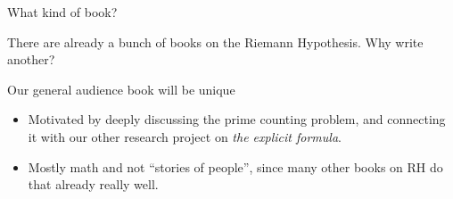 \documentclass{beamer}
\begin{document}
\begin{frame}{What kind of book?}

There are already a bunch of books on the Riemann Hypothesis.  Why write another?
\vfill 

\begin{block}{Our general audience book will be unique}
  \begin{itemize}
    \item Motivated by deeply discussing the prime counting problem, and connecting it with our other research project on {\em the explicit formula}.
    \item Mostly math and not ``stories of people'', since many other books on RH do that already really well.
  \end{itemize}
  \end{block}
\end{frame}
\end{document}
